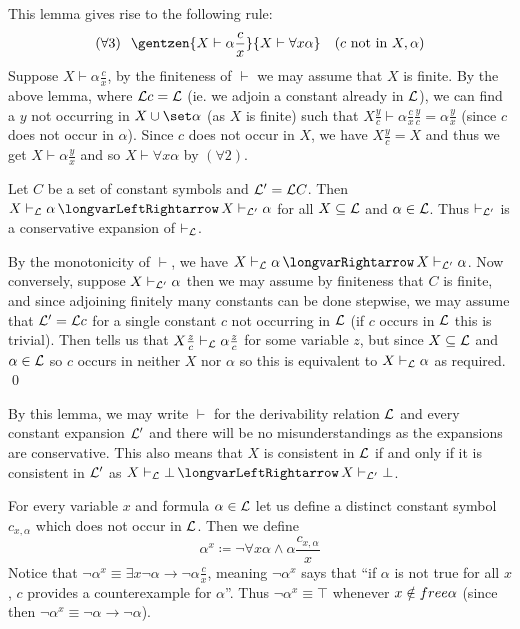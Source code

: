 This lemma gives rise to the following rule:
$$ (\forall3)\kern.25cm\gentzen{X\vdash\alpha\frac cx}{X\vdash\forall x\alpha}\quad(\hbox{$c$ not in $X,\alpha$}) $$
Suppose $X\vdash\alpha\frac cx$, by the finiteness of $\vdash$ we may assume that $X$ is finite.
By the above lemma, where ${\cal L}c={\cal L}$ (ie. we adjoin a constant already in ${\cal L}$), we can find a $y$ not occurring in $X\cup\set\alpha$ (as $X$ is finite) such that
$X\frac yc\vdash\alpha\frac cx\frac yc=\alpha\frac yx$ (since $c$ does not occur in $\alpha$).
Since $c$ does not occur in $X$, we have $X\frac yc=X$ and thus we get $X\vdash\alpha\frac yx$ and so $X\vdash\forall x\alpha$ by $(\forall2)$.

\blemm

    Let $C$ be a set of constant symbols and ${\cal L}'={\cal L}C$.
    Then $X\vdash_{\cal L}\alpha\iff X\vdash_{\cal L'}\alpha$ for all $X\subseteq{\cal L}$ and $\alpha\in{\cal L}$.
    Thus $\vdash_{\cal L'}$ is a conservative expansion of $\vdash_{\cal L}$.

\elemm

By the monotonicity of $\vdash$, we have $X\vdash_{\cal L}\alpha\implies X\vdash_{\cal L'}\alpha$.
Now conversely, suppose $X\vdash_{\cal L'}\alpha$ then we may assume by finiteness that $C$ is finite, and since adjoining finitely many constants can be done stepwise, we may assume that
${\cal L'}={\cal L}c$ for a single constant $c$ not occurring in ${\cal L}$ (if $c$ occurs in ${\cal L}$ this is trivial).
Then  tells us that $X\frac zc\vdash_{\cal L}\alpha\frac zc$ for some variable $z$, but since $X\subseteq{\cal L}$ and $\alpha\in{\cal L}$ so $c$ occurs in neither
$X$ nor $\alpha$ so this is equivalent to $X\vdash_{\cal L}\alpha$ as required.
\qed

By this lemma, we may write $\vdash$ for the derivability relation ${\cal L}$ and every constant expansion ${\cal L'}$ and there will be no misunderstandings as the expansions are conservative.
This also means that $X$ is consistent in ${\cal L}$ if and only if it is consistent in ${\cal L'}$ as $X\vdash_{\cal L}\bot\iff X\vdash_{\cal L'}\bot$.

For every variable $x$ and formula $\alpha\in{\cal L}$ let us define a distinct constant symbol $c_{x,\alpha}$ which does not occur in ${\cal L}$.
Then we define
$$ \alpha^x \coloneqq \neg\forall x\alpha\land \alpha\frac{c_{x,\alpha}}x $$
Notice that $\neg\alpha^x\equiv\exists x\neg\alpha\to\neg\alpha\frac cx$, meaning $\neg\alpha^x$ says that ``if $\alpha$ is not true for all $x$, $c$ provides a counterexample for $\alpha$''.
Thus $\neg\alpha^x\equiv\top$ whenever $x\notin{\sl free}\alpha$ (since then $\neg\alpha^x\equiv\neg\alpha\to\neg\alpha$).

